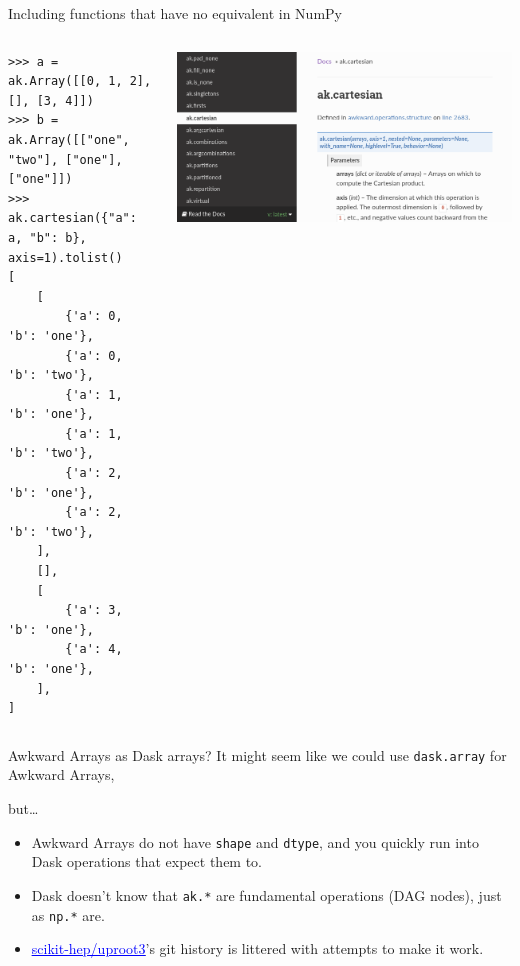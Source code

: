 \documentclass[aspectratio=169]{beamer}
\begin{document}
\begin{frame}[fragile]{Including functions that have no equivalent in NumPy}
\small
\vspace{-0.75 cm}
\begin{columns}
\begin{verbatim}
>>> a = ak.Array([[0, 1, 2], [], [3, 4]])
>>> b = ak.Array([["one", "two"], ["one"], ["one"]])
>>> ak.cartesian({"a": a, "b": b}, axis=1).tolist()
[
    [
        {'a': 0, 'b': 'one'},
        {'a': 0, 'b': 'two'},
        {'a': 1, 'b': 'one'},
        {'a': 1, 'b': 'two'},
        {'a': 2, 'b': 'one'},
        {'a': 2, 'b': 'two'},
    ],
    [],
    [
        {'a': 3, 'b': 'one'},
        {'a': 4, 'b': 'one'},
    ],
]
\end{verbatim}

\vspace{-5.5 cm}
\hfill\includegraphics[height=4 cm]{docs-cartesian.png}
\end{columns}
\end{frame}

\begin{frame}{Awkward Arrays as Dask arrays?}
\Large
It might seem like we could use \texttt{dask.array} for Awkward Arrays,

but\ldots

\large
\vspace{0.5 cm}
\begin{itemize}\setlength{\itemsep}{0.5 cm}
\item<2-> Awkward Arrays do not have \texttt{shape} and \texttt{dtype}, and you quickly run into Dask operations that expect them to.
\item<3-> Dask doesn't know that \texttt{ak.*} are fundamental operations (DAG nodes), just as \texttt{np.*} are.
\item<4-> \href{https://github.com/scikit-hep/uproot3}{\textcolor{blue}{\underline{scikit-hep/uproot3}}}'s git history is littered with attempts to make it work.
\end{itemize}
\end{frame}
\end{document}
